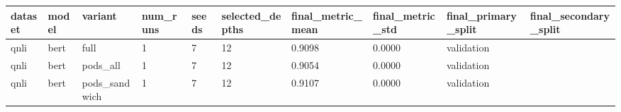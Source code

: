 \begin{tabular}{llllllllll}
\hline
dataset & model & variant & num\_runs & seeds & selected\_depths & final\_metric\_mean & final\_metric\_std & final\_primary\_split & final\_secondary\_split \\
\hline
qnli & bert & full & 1 & 7 & 12 & 0.9098 & 0.0000 & validation &  \\
qnli & bert & pods\_all & 1 & 7 & 12 & 0.9054 & 0.0000 & validation &  \\
qnli & bert & pods\_sandwich & 1 & 7 & 12 & 0.9107 & 0.0000 & validation &  \\
\hline
\end{tabular}
